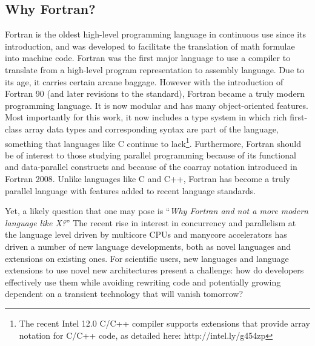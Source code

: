 \subsection{Why Fortran?}

Fortran is the oldest high-level programming language in continuous
use since its introduction, and was developed to facilitate the
translation of math formulae into machine code. Fortran was the first
major language to use a compiler to translate from a high-level
program representation to assembly language. Due to its age, it
carries certain arcane baggage.  However with the introduction of
Fortran 90 (and later revisions to the standard), Fortran became a
truly modern programming language.  It is now modular and has many
object-oriented features.  Most importantly for this work, it now
includes a type system in which rich first-class array data types and
corresponding syntax are part of the language, something that
languages like C continue to lack\footnote{The recent Intel 12.0 C/C++
  compiler supports extensions that provide array notation for C/C++
  code, as detailed here: http://intel.ly/g454zp}.  Furthermore,
Fortran should be of interest to those studying parallel programming
because of its functional and data-parallel constructs and because of
the coarray notation introduced in Fortran 2008. Unlike languages like
C and C++, Fortran has become a truly parallel language with features
added to recent language standards.


Yet, a likely question that one may pose is ``\emph{Why Fortran and
  not a more modern language like X?}''  The recent rise in interest
in concurrency and parallelism at the language level driven by
multicore CPUs and manycore accelerators has driven a number of new
language developments, both as novel languages and extensions on
existing ones.  For scientific users, new languages and language
extensions to use novel new architectures present a challenge: how do
developers effectively use them while avoiding rewriting code
and potentially growing dependent on a transient technology that will
vanish tomorrow?


